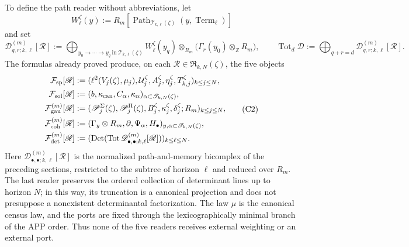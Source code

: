 To define the path reader without abbreviations, let
\[
 W_\ell^\zeta(y):=
 R_m[\operatorname{Path}_{\mathscr T_{k,\ell}(\zeta)}
          (y,\operatorname{Term}_\ell)]
\]
and set
\[
 \mathscr D_{q,r;k,\ell}^{(m)}[\mathscr R]
 :=\bigoplus_{y_0\to\cdots\to y_q\ \text{in}\
                  \mathscr T_{k,\ell}(\zeta)}
 W_\ell^\zeta(y_q)\otimes_{R_m}
 \bigl(\Gamma_r(y_0)\otimes_{\mathbb Z}R_m\bigr),
 \qquad
 \operatorname{Tot}_d\mathscr D
 :=\bigoplus_{q+r=d}\mathscr D_{q,r;k,\ell}^{(m)}[\mathscr R].
\]
The formulas already proved produce, on each
\(\mathscr R\in\mathfrak R_{k,N}(\zeta)\), the five objects
\[
\begin{aligned}
 \mathcal F_{\rm sp}[\mathscr R]
 &:=(\ell^2(V_j(\zeta),\mu_j),
       \mathcal U_j^\zeta,A_j^\zeta,\eta_j^\zeta,
       T_{k,j}^\zeta)_{k\leq j\leq N},\\
 \mathcal F_{\rm sol}[\mathscr R]
 &:=(b,\kappa_{\rm can},C_\alpha,\kappa_\alpha)
      _{\alpha\subset\mathscr T_{k,N}(\zeta)},\\
 \mathcal F_{\rm gau}^{(m)}[\mathscr R]
 &:=(\mathscr P_j^\Sigma(\zeta),\mathscr P_j^\Pi(\zeta),
       B_j^\zeta,\kappa_j^\zeta,\delta_j^\zeta;R_m)_{k\leq j\leq N},\\
 \mathcal F_{\rm coh}^{(m)}[\mathscr R]
 &:=(\Gamma_y\otimes R_m,\partial,\Psi_\alpha,H_\bullet)
      _{y,\alpha\subset\mathscr T_{k,N}(\zeta)},\\
 \mathcal F_{\rm det}^{(m)}[\mathscr R]
 &:=(\operatorname{Det}(\operatorname{Tot}
       \mathscr D_{\bullet,\bullet;k,\ell}^{(m)}[\mathscr R]))
       _{k\leq\ell\leq N}.
\end{aligned}
\tag{C2}
\label{hmtfg:base:eq:cinco-lectores-comunes}
\]
Here \(\mathscr D_{\bullet,\bullet;k,\ell}^{(m)}[\mathscr R]\) is the normalized path-and-memory bicomplex of the preceding sections, restricted to the subtree of horizon \(\ell\) and reduced over \(R_m\). The last reader preserves the ordered collection of determinant lines up to horizon \(N\); in this way, its truncation is a canonical projection and does not presuppose a nonexistent determinantal factorization. The law \(\mu\) is the canonical census law, and the ports are fixed through the lexicographically minimal branch of the APP order. Thus none of the five readers receives external weighting or an external port.

